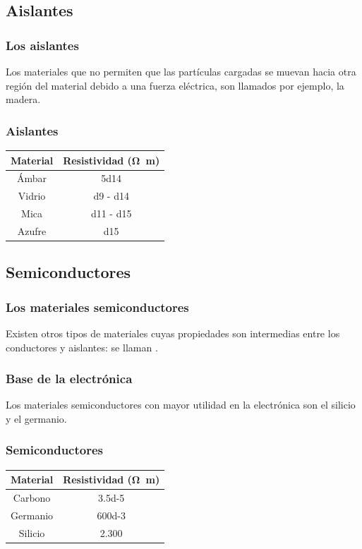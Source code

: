 \documentclass[14pt]{beamer}
\begin{document}
\subsection{Aislantes}

\begin{frame}
\frametitle{Los aislantes}
Los materiales que no permiten que las partículas cargadas se muevan hacia otra región del material debido a una fuerza eléctrica, son llamados  por ejemplo, la madera.
\end{frame}
\begin{frame}
\frametitle{Aislantes}
\begin{table}
\vspace*{-1cm}
\centering
\begin{tabular}{c | c}
Material & Resistividad (\si{\ohm\meter}) \\ \hline
Ámbar & \num{5d14} \\ \hline
Vidrio & \num{d9} - \num{d14} \\ \hline
Mica & \num{d11} - \num{d15} \\ \hline
Azufre & \num{d15} \\ \hline
\end{tabular}
\end{table}
\end{frame}

\subsection{Semiconductores}

\begin{frame}
\frametitle{Los materiales semiconductores}
Existen otros tipos de materiales cuyas propiedades son intermedias entre los conductores y aislantes: \pause  se llaman .
\end{frame}
\begin{frame}
\frametitle{Base de la electrónica}
Los materiales semiconductores con mayor utilidad en la electrónica son el silicio y el germanio.
\end{frame}
\begin{frame}
\frametitle{Semiconductores}
\begin{table}
\centering
\begin{tabular}{c | c}
Material & Resistividad (\si{\ohm\meter}) \\ \hline
Carbono & \num{3.5d-5} \\ \hline
Germanio & \num{600d-3} \\ \hline
Silicio & \num{2.300} \\ \hline
\end{tabular}
\end{table}
\end{frame}
\end{document}
